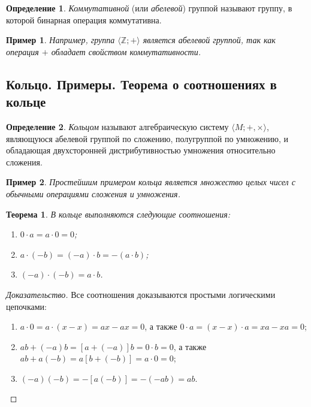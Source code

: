 \documentclass{article}
\newtheorem*{theorem*}{Теорема}
\theoremstyle{plain}
\newtheorem*{example*}{Пример}
\theoremstyle{definition}
\newtheorem{definition}{Определение}[subsection]
\begin{document}
\begin{definition}
	\textit{Коммутативной} (или \textit{абелевой}) группой называют группу, в которой бинарная операция коммутативна.
\end{definition}

\begin{example*}
	Например, группа \(\langle \mathbb{Z}; +\rangle\) является абелевой группой, так как операция \(+\) обладает свойством коммутативности.
\end{example*}

\subsection{Кольцо. Примеры. Теорема о соотношениях в кольце}

\begin{definition}
	\textit{Кольцом} называют алгебраическую систему \(\langle M; +, \times\rangle\), являющуюся абелевой группой по сложению, полугруппой по умножению, и обладающая двухсторонней дистрибутивностью умножения относительно сложения.
\end{definition}

\begin{example*}
	Простейшим примером кольца является множество целых чисел с обычными операциями сложения и умножения.
\end{example*}

\begin{theorem*}
	В кольце выполняются следующие соотношения:

	\begin{enumerate}
		\item \(0 \cdot a = a \cdot 0 = 0\);
		\item \(a \cdot (-b) = (-a) \cdot b = -(a \cdot b)\);
		\item \((-a) \cdot (-b) = a \cdot b\).
	\end{enumerate}
\end{theorem*}

\begin{proof}[Доказательство]
	Все соотношения доказываются простыми логическими цепочками:

	\begin{enumerate}
		\item \(a \cdot 0 = a \cdot (x - x) = ax - ax = 0\), а также \(0 \cdot a = (x - x) \cdot a = xa - xa = 0\); 
		\item \(ab + (-a)b = [a + (-a)]b = 0 \cdot b = 0\), а также \(ab + a(-b) = a[b + (-b)] = a \cdot 0 = 0\);
		\item \((-a)(-b) = -[a(-b)] = -(-ab) = ab\).
	\end{enumerate}
\end{proof}
\end{document}
